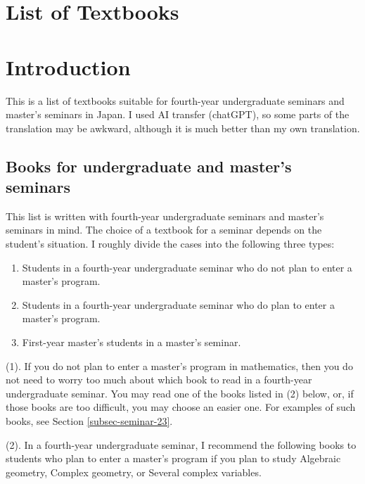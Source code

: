 \section{List of Textbooks}
\label{sec-2}

\section*{Introduction}
This is a list of textbooks suitable for fourth-year undergraduate seminars and master's seminars in Japan. 
I used AI transfer (chatGPT), so some parts of the translation may be awkward, although it is much better than my own translation.

\subsection{Books for undergraduate and master's seminars}
This list is written with fourth-year undergraduate seminars and master's seminars in mind.
The choice of a textbook for a seminar depends on the student's situation. I roughly divide the cases into the following three types:
\begin{enumerate}[label=$(\arabic*)$]
  \setlength{\parskip}{0cm} %
  \setlength{\itemsep}{0cm} %
 \item Students in a fourth-year undergraduate seminar who do not plan to enter a master's program.
\item Students in a fourth-year undergraduate seminar who do plan to enter a master's program.
\item First-year master's students in a master's seminar.
\end{enumerate}

(1). If you do not plan to enter a master's program in mathematics, then you do not need to worry too much about which book to read in a fourth-year undergraduate seminar. You may read one of the books listed in (2) below, or, if those books are too difficult, you may choose an easier one.  For examples of such books, see Section \ref{subsec-seminar-23}.

(2). In a fourth-year undergraduate seminar, I recommend the following books to students who plan to enter a master's program if you plan to study Algebraic geometry, Complex geometry, or Several complex variables.

